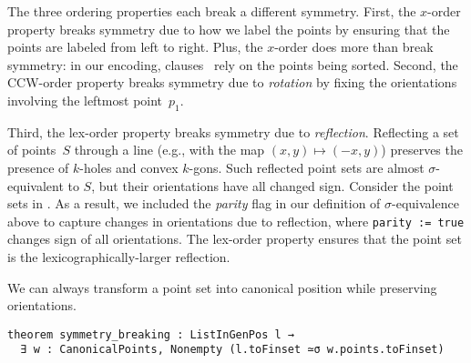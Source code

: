 The three ordering properties each break a different symmetry.
First, the $x$-order property breaks symmetry due to how we label the points by ensuring that the points are labeled from left to right.
Plus,
the $x$-order does more than break symmetry:
in our encoding, clauses~ rely on the points being sorted.
Second, the CCW-order property breaks symmetry due to \emph{rotation} by fixing the orientations involving the leftmost point~$p_1$.



Third, the lex-order property breaks symmetry due to \emph{reflection}.
Reflecting a set of points~$S$ through a line (e.g., with the map $(x, y) \mapsto (-x, y)$)
preserves the presence of $k$-holes and convex $k$-gons.
Such reflected point sets are almost $\sigma$-equivalent to $S$,
but their orientations have all changed sign.
Consider the point sets in .
As a result,
we included the \emph{parity} flag in our definition of $\sigma$-equivalence above
to capture changes in orientations due to reflection,
where \lstinline|parity := true| changes sign of all orientations.
The lex-order property ensures that the point set is the lexicographically-larger reflection.

We can always transform a point set into canonical position while preserving orientations.


\begin{lstlisting}
theorem symmetry_breaking : ListInGenPos l →
  ∃ w : CanonicalPoints, Nonempty (l.toFinset ≃σ w.points.toFinset)
\end{lstlisting}


